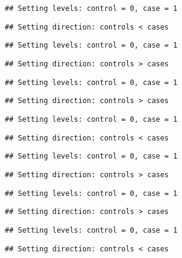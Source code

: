 \documentclass[
]{article}
\begin{document}
\begin{verbatim}
## Setting levels: control = 0, case = 1
\end{verbatim}

\begin{verbatim}
## Setting direction: controls < cases
\end{verbatim}

\begin{verbatim}
## Setting levels: control = 0, case = 1
\end{verbatim}

\begin{verbatim}
## Setting direction: controls > cases
\end{verbatim}

\begin{verbatim}
## Setting levels: control = 0, case = 1
\end{verbatim}

\begin{verbatim}
## Setting direction: controls > cases
\end{verbatim}

\begin{verbatim}
## Setting levels: control = 0, case = 1
\end{verbatim}

\begin{verbatim}
## Setting direction: controls < cases
\end{verbatim}

\begin{verbatim}
## Setting levels: control = 0, case = 1
\end{verbatim}

\begin{verbatim}
## Setting direction: controls > cases
\end{verbatim}

\begin{verbatim}
## Setting levels: control = 0, case = 1
\end{verbatim}

\begin{verbatim}
## Setting direction: controls > cases
\end{verbatim}

\begin{verbatim}
## Setting levels: control = 0, case = 1
\end{verbatim}

\begin{verbatim}
## Setting direction: controls < cases
\end{verbatim}
\end{document}
